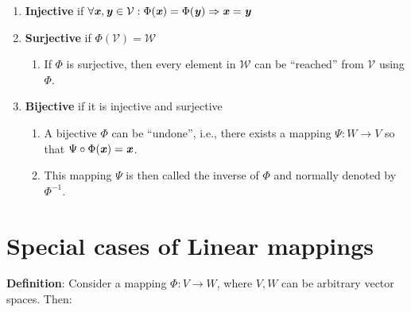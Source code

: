 \begin{enumerate}
    \item \textbf{Injective} if $\forall \text{\textbf{\textit{x}}}, \text{\textbf{\textit{y}}} \in \mathcal{V} : \Phi(\text{\textbf{\textit{x}}}) = \Phi(\text{\textbf{\textit{y}}}) \Rightarrow \text{\textbf{\textit{x}}} = \text{\textbf{\textit{y}}}$
    \hfill \cite{mfml/book/mml/Deisenroth-Faisal-Ong}

    \item \textbf{Surjective} if $\Phi(\mathcal{V}) = \mathcal{W}$
    \hfill \cite{mfml/book/mml/Deisenroth-Faisal-Ong}
    \begin{enumerate}
        \item If $\Phi$ is surjective, then every element in $\mathcal{W}$ can be “reached” from $\mathcal{V}$ using $\Phi$.
        \hfill \cite{mfml/book/mml/Deisenroth-Faisal-Ong}
    \end{enumerate}
    
    \item \textbf{Bijective} if it is injective and surjective
    \hfill \cite{mfml/book/mml/Deisenroth-Faisal-Ong}
    \begin{enumerate}
        \item A bijective $\Phi$ can be “undone”, i.e., there exists a mapping $\Psi : W \to V$ so that $\Psi \circ \Phi(\text{\textbf{\textit{x}}}) = \text{\textbf{\textit{x}}}$.
        \hfill \cite{mfml/book/mml/Deisenroth-Faisal-Ong}

        \item This mapping $\Psi$ is then called the inverse of $\Phi$ and normally denoted by $\Phi^{-1}$.
        \hfill \cite{mfml/book/mml/Deisenroth-Faisal-Ong}
    \end{enumerate}    

\end{enumerate}


















\section{Special cases of Linear mappings}

\textbf{Definition}: Consider a mapping $\Phi : V \to W$, where $V, W$ can be arbitrary vector spaces. 
Then:
\hfill \cite{mfml/book/mml/Deisenroth-Faisal-Ong}

